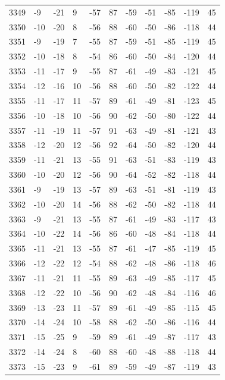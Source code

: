 \begin{table}[H]
\begin{tabular}{lllllllllll}
3349 & -9 & -21 & 9 & -57 & 87 & -59 & -51 & -85 & -119 & 45 \\
3350 & -10 & -20 & 8 & -56 & 88 & -60 & -50 & -86 & -118 & 44 \\
3351 & -9 & -19 & 7 & -55 & 87 & -59 & -51 & -85 & -119 & 45 \\
3352 & -10 & -18 & 8 & -54 & 86 & -60 & -50 & -84 & -120 & 44 \\
3353 & -11 & -17 & 9 & -55 & 87 & -61 & -49 & -83 & -121 & 45 \\
3354 & -12 & -16 & 10 & -56 & 88 & -60 & -50 & -82 & -122 & 44 \\
3355 & -11 & -17 & 11 & -57 & 89 & -61 & -49 & -81 & -123 & 45 \\
3356 & -10 & -18 & 10 & -56 & 90 & -62 & -50 & -80 & -122 & 44 \\
3357 & -11 & -19 & 11 & -57 & 91 & -63 & -49 & -81 & -121 & 43 \\
3358 & -12 & -20 & 12 & -56 & 92 & -64 & -50 & -82 & -120 & 44 \\
3359 & -11 & -21 & 13 & -55 & 91 & -63 & -51 & -83 & -119 & 43 \\
3360 & -10 & -20 & 12 & -56 & 90 & -64 & -52 & -82 & -118 & 44 \\
3361 & -9 & -19 & 13 & -57 & 89 & -63 & -51 & -81 & -119 & 43 \\
3362 & -10 & -20 & 14 & -56 & 88 & -62 & -50 & -82 & -118 & 44 \\
3363 & -9 & -21 & 13 & -55 & 87 & -61 & -49 & -83 & -117 & 43 \\
3364 & -10 & -22 & 14 & -56 & 86 & -60 & -48 & -84 & -118 & 44 \\
3365 & -11 & -21 & 13 & -55 & 87 & -61 & -47 & -85 & -119 & 45 \\
3366 & -12 & -22 & 12 & -54 & 88 & -62 & -48 & -86 & -118 & 46 \\
3367 & -11 & -21 & 11 & -55 & 89 & -63 & -49 & -85 & -117 & 45 \\
3368 & -12 & -22 & 10 & -56 & 90 & -62 & -48 & -84 & -116 & 46 \\
3369 & -13 & -23 & 11 & -57 & 89 & -61 & -49 & -85 & -115 & 45 \\
3370 & -14 & -24 & 10 & -58 & 88 & -62 & -50 & -86 & -116 & 44 \\
3371 & -15 & -25 & 9 & -59 & 89 & -61 & -49 & -87 & -117 & 43 \\
3372 & -14 & -24 & 8 & -60 & 88 & -60 & -48 & -88 & -118 & 44 \\
3373 & -15 & -23 & 9 & -61 & 89 & -59 & -49 & -87 & -119 & 43 \\

\end{tabular}
\end{table}
